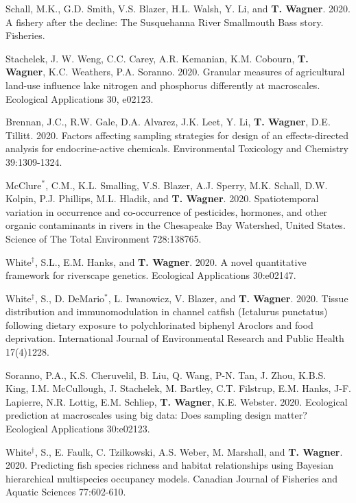 \documentclass[10pt]{article}
\begin{document}
\begin{flushleft}
\begin{etaremune}[start=103]
\item Schall, M.K., G.D. Smith, V.S. Blazer, H.L. Walsh, Y. Li, and \textbf{T. Wagner}.  2020.  A fishery after the decline: The Susquehanna River Smallmouth Bass story.  Fisheries.	
	
\item Stachelek, J. W. Weng, C.C. Carey, A.R. Kemanian, K.M. Cobourn, \textbf{T. Wagner}, K.C. Weathers, P.A. Soranno. 2020. Granular measures of agricultural land-use influence lake nitrogen and phosphorus differently at macroscales. Ecological Applications 30, e02123.

\item Brennan, J.C., R.W. Gale, D.A. Alvarez, J.K. Leet, Y. Li, \textbf{T. Wagner}, D.E. Tillitt. 2020. Factors affecting sampling strategies for design of an effects-directed analysis for endocrine-active chemicals. Environmental Toxicology and Chemistry 39:1309-1324.

\item McClure$^*$, C.M., K.L. Smalling, V.S. Blazer, A.J. Sperry, M.K. Schall, D.W. Kolpin, P.J. Phillips, M.L. Hladik, and \textbf{T. Wagner}. 2020. Spatiotemporal variation in occurrence and co-occurrence of pesticides, hormones, and other organic contaminants in rivers in the Chesapeake Bay Watershed, United States. Science of The Total Environment 728:138765.

\item  White$^\dagger$, S.L., E.M. Hanks, and \textbf{T. Wagner}. 2020. A novel quantitative framework for riverscape genetics. Ecological Applications 30:e02147.

\item White$^\dagger$, S., D. DeMario$^*$, L. Iwanowicz, V. Blazer, and \textbf{T. Wagner}. 2020. Tissue distribution and immunomodulation in channel catfish (Ictalurus punctatus) following dietary exposure to polychlorinated biphenyl Aroclors and food deprivation. International Journal of Environmental Research and Public Health 17(4)1228.

\item Soranno, P.A., K.S. Cheruvelil, B. Liu, Q. Wang, P-N. Tan, J. Zhou, K.B.S. King, I.M. McCullough, J. Stachelek, M. Bartley, C.T. Filstrup, E.M. Hanks, J-F. Lapierre, N.R. Lottig, E.M. Schliep, \textbf{T. Wagner}, K.E. Webster. 2020. Ecological prediction at macroscales using big data: Does sampling design matter? Ecological Applications 30:e02123. 

\item White$^\dagger$, S., E. Faulk, C. Tzilkowski, A.S. Weber, M. Marshall, and \textbf{T. Wagner}. 2020. Predicting fish species richness and habitat relationships using Bayesian hierarchical multispecies occupancy models. Canadian Journal of Fisheries and Aquatic Sciences 77:602-610.
	

\end{etaremune}
\end{flushleft}
\end{document}
